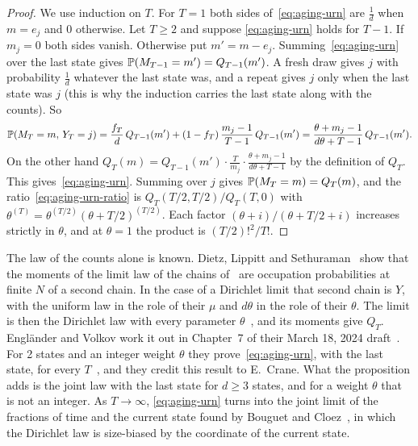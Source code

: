 \begin{proof}
We use induction on $T$. For $T=1$ both sides of~\eqref{eq:aging-urn} are
$\frac1d$ when $m=e_j$ and $0$ otherwise. Let $T\ge2$ and suppose
\eqref{eq:aging-urn} holds for $T-1$. If $m_j=0$ both sides vanish. Otherwise
put $m'=m-e_j$. Summing~\eqref{eq:aging-urn} over the last state gives
$\mathbb{P}(M_{T-1}=m')=Q_{T-1}(m')$. A fresh draw gives $j$ with probability
$\frac1d$ whatever the last state was, and a repeat gives $j$ only when the
last state was $j$ (this is why the induction carries the last state along
with the counts). So
\[
 \mathbb{P}(M_T=m,\,Y_T=j)
 =\frac{f_T}{d}\,Q_{T-1}(m')+(1-f_T)\,\frac{m_j-1}{T-1}\,Q_{T-1}(m')
 =\frac{\theta+m_j-1}{d\theta+T-1}\,Q_{T-1}(m') .
\]
On the other hand
$Q_T(m)=Q_{T-1}(m')\cdot\frac{T}{m_j}\cdot\frac{\theta+m_j-1}{d\theta+T-1}$ by
the definition of $Q_T$. This gives~\eqref{eq:aging-urn}. Summing over $j$
gives $\mathbb{P}(M_T=m)=Q_T(m)$, and the ratio~\eqref{eq:aging-urn-ratio} is
$Q_T(T/2,T/2)/Q_T(T,0)$ with
$\theta^{(T)}=\theta^{(T/2)}(\theta+T/2)^{(T/2)}$. Each factor
$(\theta+i)/(\theta+T/2+i)$ increases strictly in $\theta$, and at
$\theta=1$ the product is $(T/2)!^2/T!$.
\end{proof}

The law of the counts alone is known. Dietz, Lippitt and
Sethuraman~\cite[Theorem~2.18]{dls2023} show that the moments of the limit
law of the chains of~\cite{ds2007} are occupation probabilities at finite $N$
of a second chain. In the case of a Dirichlet limit that second chain is
$Y$, with the uniform law in the role of their $\mu$ and $d\theta$ in the role
of their $\theta$. The limit is then the Dirichlet law with every parameter
$\theta$~\cite[Theorem~1.4]{ds2007}, and its moments give $Q_T$.
Engl\"ander and Volkov work it out in Chapter~7 of their
March 18, 2024 draft~\cite{ev2024}. For 2 states and an integer weight $\theta$
they prove~\eqref{eq:aging-urn}, with the last state, for every
$T$~, and they credit this result to E.~Crane.
What the proposition adds is the joint law with the last state for $d\ge3$
states, and for a weight $\theta$ that is not an integer. As $T\to\infty$,
\eqref{eq:aging-urn} turns into the joint limit of the fractions of time and
the current state found by Bouguet and Cloez~\cite[Proposition~4.1]{bc2018},
in which the Dirichlet law is size-biased by the coordinate of the current
state.

